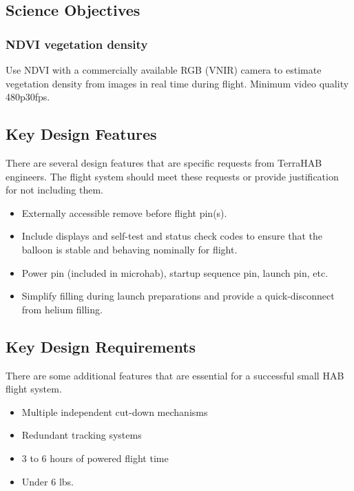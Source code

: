 \subsection{Science Objectives}
\subsubsection{NDVI vegetation density}
Use NDVI with a commercially available RGB (VNIR) camera to estimate vegetation
density from images in real time during flight. Minimum video quality
480p\@30fps.

\subsection{Key Design Features}
There are several design features that are specific requests from TerraHAB
engineers. The flight system should meet these requests or provide justification
for not including them.

\begin{itemize}
    \item Externally accessible remove before flight pin(s). 
    \item Include displays and self-test and status check codes to ensure that the balloon is stable and behaving nominally for flight.
    \item Power pin (included in microhab), startup sequence pin, launch pin, etc.
    \item Simplify filling during launch preparations and provide a quick-disconnect from helium filling.
\end{itemize}
 
\subsection{Key Design Requirements}
There are some additional features that are essential for a successful small HAB
flight system.

\begin{itemize}
    \item Multiple independent cut-down mechanisms
    \item Redundant tracking systems
    \item 3 to 6 hours of powered flight time
    \item Under 6 lbs.
\end{itemize}
